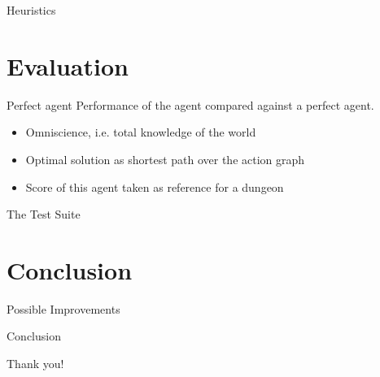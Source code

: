 \documentclass[smaller,dvipsnames,ratio=169]{beamer}
\begin{document}
  \begin{frame}{Heuristics}
  \end{frame}

  \section{Evaluation}

  \begin{frame}{Perfect agent}
    Performance of the agent compared against a \alert{perfect} agent.
    \begin{itemize}
      \item \alert{Omniscience}, i.e. total knowledge of the world 
      \item Optimal solution as shortest path over the action graph
      \item Score of this agent taken as reference for a dungeon
    \end{itemize}
  \end{frame}

  \begin{frame}{The Test Suite}

  \end{frame}

  \section{Conclusion}

  \begin{frame}{Possible Improvements}
  \end{frame}

  \begin{frame}{Conclusion}
  \end{frame}

  \begin{frame}[standout]
    Thank you!
  \end{frame}
\end{document}
